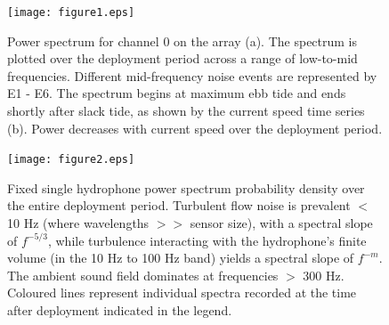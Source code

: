 \documentclass[12pt,journal,onecolumn]{IEEEtran}
\begin{document}
\begin{figure}[H]
	\begin{center}
		\texttt{[image: figure1.eps]} %
	\end{center}
	\caption[Hydrophone power spectra]{
	\label{f:power}
Power spectrum for channel 0 on the array (a). The spectrum is plotted over the deployment period across a range of low-to-mid frequencies. Different mid-frequency noise events are represented by E1 - E6.  The spectrum begins at maximum ebb tide and ends shortly after slack tide, as shown by the current speed time series (b). Power decreases with current  speed over the deployment period. }
\end{figure}
\begin{figure}[H]
	\begin{center}
		\texttt{[image: figure2.eps]} %
	\end{center}
	\caption[Power spectrum probability density]{
	\label{f:lines}
	Fixed single hydrophone power spectrum probability density over the entire deployment period. Turbulent flow noise is prevalent $<$ 10 Hz (where wavelengths $>>$ sensor size), with a spectral slope of $f^{-5/3}$, while turbulence interacting with the hydrophone's finite volume (in the 10 Hz to 100 Hz band) yields a spectral slope of $f^{-m}$. The ambient sound field dominates at frequencies $>$ 300 Hz. Coloured lines represent individual spectra recorded at the time after deployment indicated in the legend.}
\end{figure}
\end{document}
